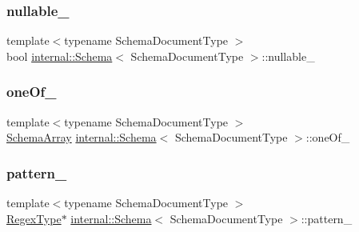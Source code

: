 \mbox{\label{classinternal_1_1Schema_a1184415e116f1b9486fb12eea446f6ef}} 
\subsubsection{\texorpdfstring{nullable\+\_\+}{nullable\_}}
{\footnotesize\ttfamily template$<$typename Schema\+Document\+Type $>$ \\
bool \hyperlink{classinternal_1_1Schema}{internal\+::\+Schema}$<$ Schema\+Document\+Type $>$\+::nullable\+\_\+\hspace{0.3cm}{\ttfamily [private]}}

\mbox{\label{classinternal_1_1Schema_a38d1cc94496af0a9de549822e2619a2f}} 
\subsubsection{\texorpdfstring{one\+Of\+\_\+}{oneOf\_}}
{\footnotesize\ttfamily template$<$typename Schema\+Document\+Type $>$ \\
\hyperlink{structinternal_1_1Schema_1_1SchemaArray}{Schema\+Array} \hyperlink{classinternal_1_1Schema}{internal\+::\+Schema}$<$ Schema\+Document\+Type $>$\+::one\+Of\+\_\+\hspace{0.3cm}{\ttfamily [private]}}

\mbox{\label{classinternal_1_1Schema_ae69698bd9f1f38bf8aac747ed7441d79}} 
\subsubsection{\texorpdfstring{pattern\+\_\+}{pattern\_}}
{\footnotesize\ttfamily template$<$typename Schema\+Document\+Type $>$ \\
\hyperlink{classinternal_1_1Schema_a78fd42fda3cecdad0ee56559b4e3cec6}{Regex\+Type}$\ast$ \hyperlink{classinternal_1_1Schema}{internal\+::\+Schema}$<$ Schema\+Document\+Type $>$\+::pattern\+\_\+\hspace{0.3cm}{\ttfamily [private]}}

